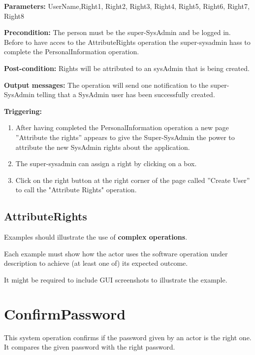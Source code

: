 \begin{description}

\item \textbf{Parameters:} UserName,Right1, Right2, Right3, Right4, Right5,
Right6, Right7, Right8
\item \textbf{Precondition:} The person must be the super-SysAdmin and be logged
in. Before to have acces to the AttributeRights operation the super-sysadmin
hass to complete the PersonalInformation operation.
\item \textbf{Post-condition:} Rights will be attributed to an sysAdmin that is
being created.
\item \textbf{Output messages:} The operation will send one notification to the
super-SysAdmin telling that a SysAdmin user has been successfully created.


\item \textbf{Triggering:}
\begin{enumerate}
 \item After having completed the PersonalInformation operation a new page
 ''Attribute the rights'' appears to give the Super-SysAdmin the power to attribute the new SysAdmin rights about the application.
\item The super-sysadmin can assign a right by clicking on a box.
\item Click on the right button at the right corner of the page called
''Create User'' to call the "Attribute Rights" operation.

\end{enumerate}

 
\end{description}

 
\subsection{AttributeRights}
Examples should illustrate the use of \textbf{complex operations}.

Each example must show how the actor uses the software operation under
description to achieve (at least one of) its expected outcome.

It might be required to include GUI screenshots to illustrate the example.






\section{ConfirmPassword}
\label{operation:ConfirmPassword}
This system operation confirms if the password given by an actor is the right
one. It compares the given password with the right password.

